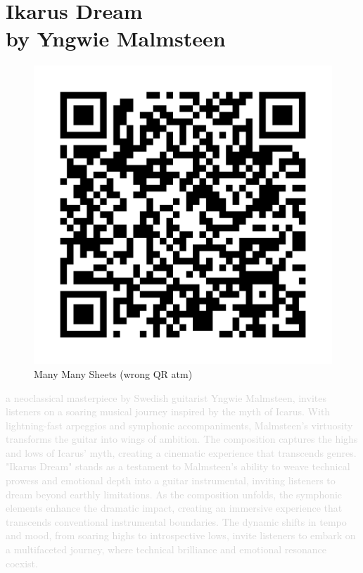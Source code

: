 \chapter[Ikarus Dream]{Ikarus Dream\\[1ex]\large{by Yngwie Malmsteen}}

\begin{figure}
\includegraphics[width=1\linewidth]{QR_Codes/QR_SultansOfSwing_BassChords.png}\\
Many Many Sheets (wrong QR atm)
\end{figure}

\textcolor{lightgray}{a neoclassical masterpiece by Swedish guitarist Yngwie Malmsteen, invites listeners on a soaring musical journey inspired by the myth of Icarus. With lightning-fast arpeggios and symphonic accompaniments, Malmsteen's virtuosity transforms the guitar into wings of ambition. The composition captures the highs and lows of Icarus' myth, creating a cinematic experience that transcends genres. "Ikarus Dream" stands as a testament to Malmsteen's ability to weave technical prowess and emotional depth into a guitar instrumental, inviting listeners to dream beyond earthly limitations.
As the composition unfolds, the symphonic elements enhance the dramatic impact, creating an immersive experience that transcends conventional instrumental boundaries. The dynamic shifts in tempo and mood, from soaring highs to introspective lows, invite listeners to embark on a multifaceted journey, where technical brilliance and emotional resonance coexist.}\\
